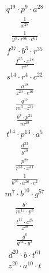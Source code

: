 \begin{align}
q^{19}\cdot p^{9}\cdot a^{28}
\end{align}
\begin{align}
\frac{1}{x^{28}}
\end{align}
\begin{align}
\frac{1}{y^{3}\cdot r^{86}\cdot c^{61}}
\end{align}
\begin{align}
f^{37}\cdot b^{3}\cdot r^{35}
\end{align}
\begin{align}
\frac{f^{25}\cdot x^{18}}{r^{32}}
\end{align}
\begin{align}
s^{14}\cdot r^{4}\cdot c^{22}
\end{align}
\begin{align}
\frac{a^{18}}{z^{20}\cdot c^{10}}
\end{align}
\begin{align}
\frac{q^{17}}{m^{3}\cdot z^{31}}
\end{align}
\begin{align}
\frac{b^{7}\cdot p^{21}}{m^{29}}
\end{align}
\begin{align}
t^{14}\cdot p^{13}\cdot a^{5}
\end{align}
\begin{align}
\frac{d^{33}}{b^{29}}
\end{align}
\begin{align}
\frac{p^{27}}{r^{23}\cdot x^{41}}
\end{align}
\begin{align}
\frac{1}{b^{26}\cdot a^{26}\cdot c^{2}}
\end{align}
\begin{align}
m^{7}\cdot b^{10}\cdot g^{57}
\end{align}
\begin{align}
\frac{b^{5}}{m^{11}\cdot p^{3}}
\end{align}
\begin{align}
\frac{t^{17}\cdot c^{25}}{z^{28}}
\end{align}
\begin{align}
\frac{g^{6}}{q^{34}\cdot y^{3}}
\end{align}
\begin{align}
d^{20}\cdot b\cdot t^{61}
\end{align}
\begin{align}
z^{20}\cdot a^{10}\cdot t
\end{align}
